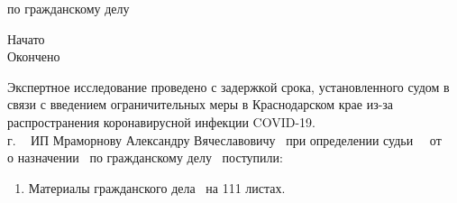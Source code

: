 \par
\vspace{-3mm}\noindent по гражданскому делу \delonum \, \isk \\[0mm]


\noindent\parbox[l][15mm]{13.5cm}
{
\noindent
Начато\hfill            \datastart\\%
Окончено \hfill          \dataend\\
}


Экспертное исследование проведено с задержкой срока, установленного судом в связи с введением  ограничительных меры в Краснодарском крае из-за распространения коронавирусной инфекции COVID-19.\\
\noindent\datastart г. ~ ИП Мраморнову Александру Вячеславовичу \,  при определении судьи \, \sud  \,  от \, \dataopr \, о назначении \opr \, по гражданскому делу \delonum \, поступили:

\begin{enumerate}\item  Материалы гражданского дела \delonum \,  на 111 листах.\\[-10mm]
	\end{enumerate}

